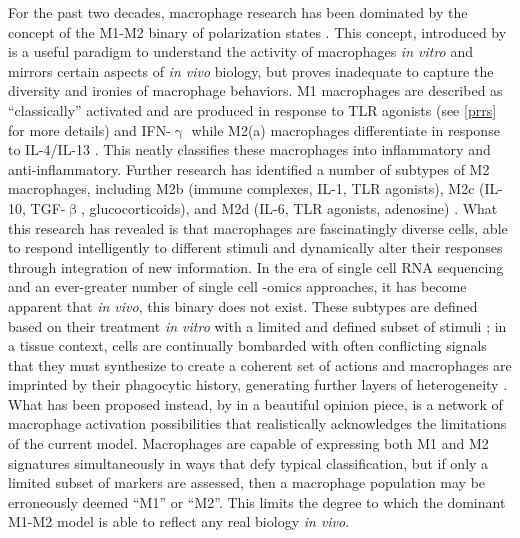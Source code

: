 For the past two decades, macrophage research has been dominated by the concept of the M1\hyp{}M2 binary of polarization states \citep{Italiani2014, Mills2015}. This concept, introduced by \citet{Mills2000} is a useful paradigm to understand the activity of macrophages \textit{in vitro} and mirrors certain aspects of \textit{in vivo} biology, but proves inadequate to capture the diversity and ironies of macrophage behaviors. M1 macrophages are described as ``classically'' activated and are produced in response to TLR agonists (see \autoref{prrs} for more details) and IFN\hyp{}$\upgamma$ while M2(a) macrophages differentiate in response to IL\hyp{}4/IL\hyp{}13 \citep{Mills2014, Wynn2013}. This neatly classifies these macrophages into inflammatory and anti\hyp{}inflammatory. Further research has identified a number of subtypes of M2 macrophages, including M2b (immune complexes, IL\hyp{}1, TLR agonists), M2c (IL\hyp{}10, TGF\hyp{}$\upbeta$, glucocorticoids), and M2d (IL\hyp{}6, TLR agonists, adenosine) \citep{Huang2018, Viola2019}. What this research has revealed is that macrophages are fascinatingly diverse cells, able to respond intelligently to different stimuli and dynamically alter their responses through integration of new information. In the era of single cell RNA sequencing and an ever\hyp{}greater number of single cell \hyp{}omics approaches, it has become apparent that \textit{in vivo}, this binary does not exist. These subtypes are defined based on their treatment \textit{in vitro} with a limited and defined subset of stimuli \citep{Gosselin2014, Wynn2013}; in a tissue context, cells are continually bombarded with often conflicting signals that they must synthesize to create a coherent set of actions \citep{Murray2014} and macrophages are imprinted by their phagocytic history, generating further layers of heterogeneity \citep{Gonzalez2017}. What has been proposed instead, by \citet{Nahrendorf2016} in a beautiful opinion piece, is a network of macrophage activation possibilities that realistically acknowledges the limitations of the current model. Macrophages are capable of expressing both M1 and M2 signatures simultaneously in ways that defy typical classification, but if only a limited subset of markers are assessed, then a macrophage population may be erroneously deemed ``M1'' or ``M2''. This limits the degree to which the dominant M1\hyp{}M2 model is able to reflect any real biology \textit{in vivo}. 

